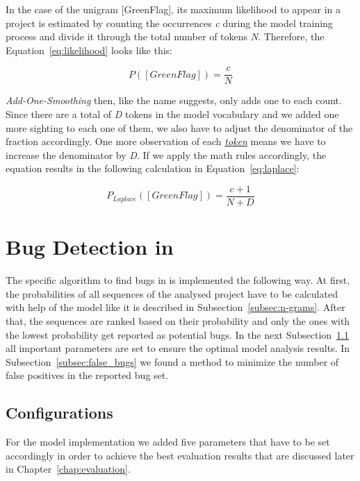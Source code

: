 In the case of the unigram [GreenFlag], its maximum likelihood to appear in a \scratch{} project is estimated by counting the occurrences \textit{c} during the model training process and divide it through the total number of tokens \textit{N}. Therefore, the Equation~\ref{eq:likelihood} looks like this:

\begin{equation} \label{eq:likelihood}
P([GreenFlag]) ={} \frac{c}{N}
\end{equation}

\textit{Add-One-Smoothing} then, like the name suggests, only adds one to each count. Since there are a total of \textit{D} tokens in the model vocabulary and we added one more sighting to each one of them, we also have to adjust the denominator of the fraction accordingly. One more observation of each \hyperref[def:token]{\textit{token}} means we have to increase the denominator by \textit{D}. If we apply the math rules accordingly, the equation results in the following calculation in Equation~\ref{eq:laplace}:

\begin{equation} \label{eq:laplace}
P_{Laplace}([GreenFlag]) ={} \frac{c + 1}{N + D}
\end{equation}


\section{Bug Detection in \scratch{}}\label{sec:detection}
The specific algorithm to find bugs in \scratch{} is implemented the following way. At first, the probabilities of all sequences of the analysed project have to be calculated with help of the model like it is described in Subsection~\ref{subsec:n-grams}. After that, the sequences are ranked based on their probability and only the ones with the lowest probability get reported as potential bugs. In the next Subsection~\ref{subsec:configurations} all important parameters are set to ensure the optimal model analysis results. In Subsection~\ref{subsec:false_bugs} we found a method to minimize the number of false positives in the reported bug set.

\subsection{Configurations}\label{subsec:configurations}
For the \scratch{} model implementation we added five parameters that have to be set accordingly in order to achieve the best evaluation results that are discussed later in Chapter~\ref{chap:evaluation}.

